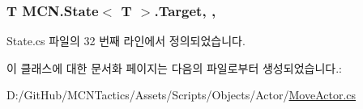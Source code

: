 \subsubsection[{\texorpdfstring{Target}{Target}}]{\setlength{\rightskip}{0pt plus 5cm}T {\bf M\+C\+N.\+State}$<$ T $>$.Target\hspace{0.3cm}{\ttfamily [get]}, {\ttfamily [protected]}, {\ttfamily [inherited]}}\hypertarget{class_m_c_n_1_1_state_a93ba2fd920292031bd6e65b1dc505cb3}{}\label{class_m_c_n_1_1_state_a93ba2fd920292031bd6e65b1dc505cb3}


State.\+cs 파일의 32 번째 라인에서 정의되었습니다.



이 클래스에 대한 문서화 페이지는 다음의 파일로부터 생성되었습니다.\+:\begin{DoxyCompactItemize}
\item 
D\+:/\+Git\+Hub/\+M\+C\+N\+Tactics/\+Assets/\+Scripts/\+Objects/\+Actor/\hyperlink{_move_actor_8cs}{Move\+Actor.\+cs}\end{DoxyCompactItemize}
